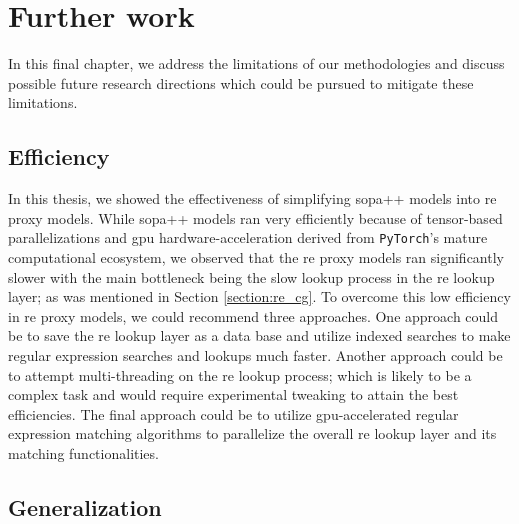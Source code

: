 \chapter{Further work}

\label{chapter:further_work}

In this final chapter, we address the limitations of our methodologies and
discuss possible future research directions which could be pursued to mitigate
these limitations.

\section{Efficiency}

In this thesis, we showed the effectiveness of simplifying \ac{sopa}++ models into \ac{re}
proxy models. While \ac{sopa}++ models ran very efficiently because of tensor-based
parallelizations and \ac{gpu} hardware-acceleration derived from \texttt{PyTorch}'s
mature computational ecosystem, we observed that the \ac{re} proxy models ran
significantly slower with the main bottleneck being the slow lookup process in
the \ac{re} lookup layer; as was mentioned in Section \ref{section:re_cg}. To
overcome this low efficiency in \ac{re} proxy models, we could recommend three
approaches. One approach could be to save the \ac{re} lookup layer as a data base and
utilize indexed searches to make regular expression searches and lookups much
faster. Another approach could be to attempt multi-threading on the \ac{re}
lookup process; which is likely to be a complex task and would require
experimental tweaking to attain the best efficiencies. The final approach could
be to utilize \ac{gpu}-accelerated regular expression matching algorithms
\citep{wang2011gregex,zu2012gpu,yu2013gpu} to parallelize the overall \ac{re} lookup
layer and its matching functionalities.

\section{Generalization}

